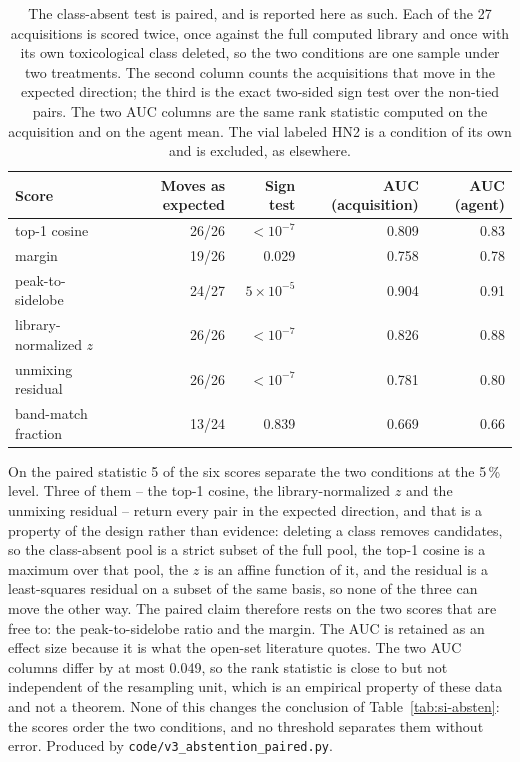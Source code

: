 \documentclass[11pt]{article}
\begin{document}
\begin{table}[htbp]
\centering
\caption{The class-absent test is paired, and is reported here as such. Each of the 27 acquisitions is scored twice, once against the full computed library and once with its own toxicological class deleted, so the two conditions are one sample under two treatments. The second column counts the acquisitions that move in the expected direction; the third is the exact two-sided sign test over the non-tied pairs. The two AUC columns are the same rank statistic computed on the acquisition and on the agent mean. The vial labeled HN2 is a condition of its own and is excluded, as elsewhere.}
\label{tab:si-abstpaired}
\small
\begin{tabular}{lrrrr}
\toprule
Score & Moves as expected & Sign test & AUC (acquisition) & AUC (agent) \\
\midrule
top-1 cosine & 26/26 & $<10^{-7}$ & 0.809 & 0.83 \\
margin & 19/26 & 0.029 & 0.758 & 0.78 \\
peak-to-sidelobe & 24/27 & $5\times10^{-5}$ & 0.904 & 0.91 \\
library-normalized $z$ & 26/26 & $<10^{-7}$ & 0.826 & 0.88 \\
unmixing residual & 26/26 & $<10^{-7}$ & 0.781 & 0.80 \\
band-match fraction & 13/24 & 0.839 & 0.669 & 0.66 \\
\bottomrule
\end{tabular}

\begin{flushleft}\footnotesize On the paired statistic 5 of the six scores separate the two conditions at the 5\,\% level. Three of them -- the top-1 cosine, the library-normalized $z$ and the unmixing residual -- return every pair in the expected direction, and that is a property of the design rather than evidence: deleting a class removes candidates, so the class-absent pool is a strict subset of the full pool, the top-1 cosine is a maximum over that pool, the $z$ is an affine function of it, and the residual is a least-squares residual on a subset of the same basis, so none of the three can move the other way. The paired claim therefore rests on the two scores that are free to: the peak-to-sidelobe ratio and the margin. The AUC is retained as an effect size because it is what the open-set literature quotes. The two AUC columns differ by at most 0.049, so the rank statistic is close to but not independent of the resampling unit, which is an empirical property of these data and not a theorem. None of this changes the conclusion of Table~\ref{tab:si-absten}: the scores order the two conditions, and no threshold separates them without error. Produced by \texttt{code/v3\_abstention\_paired.py}.\end{flushleft}
\end{table}
\clearpage
\end{document}
